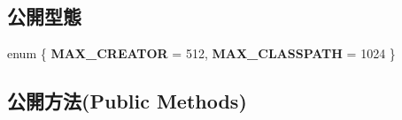\subsection*{公開型態}
\begin{DoxyCompactItemize}
\item 
enum \{ {\bfseries M\+A\+X\+\_\+\+C\+R\+E\+A\+T\+OR} = 512, 
{\bfseries M\+A\+X\+\_\+\+C\+L\+A\+S\+S\+P\+A\+TH} = 1024
 \}\hypertarget{class_i_dream_sky_1_1_entity_a5d4389753a4dbbb63b96e8be22d0ae16}{}\label{class_i_dream_sky_1_1_entity_a5d4389753a4dbbb63b96e8be22d0ae16}

\end{DoxyCompactItemize}
\subsection*{公開方法(Public Methods)}
